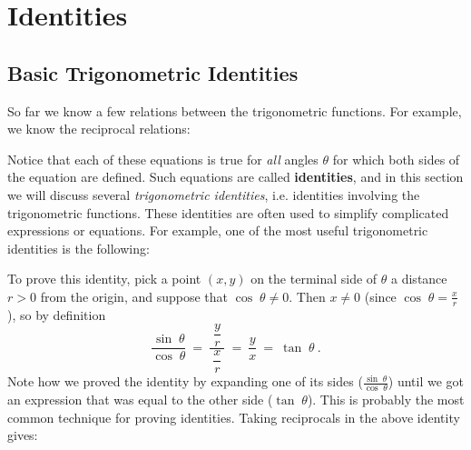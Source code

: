 \chapter{Identities}
\section{Basic Trigonometric Identities}
So far we know a few relations between the trigonometric functions. For example, we know the
reciprocal relations:

\begin{center}\end{center}

Notice that each of these equations is true for \emph{all} angles $\theta$ for which both sides
of the equation are defined. Such equations are called \textbf{identities}, and
in this section we will discuss several \emph{trigonometric identities}, i.e. identities involving
the trigonometric functions. These identities are often used to simplify complicated expressions or
equations. For example, one of the most useful trigonometric identities is the following:

\begin{center}\end{center}

To prove this identity, pick a point $(x,y)$ on the terminal side of $\theta$ a distance $r >0$ from
the origin, and suppose that $\cos\;\theta \ne 0$. Then $x \ne 0$ (since $\cos\;\theta =
\frac{x}{r}$), so by definition
\begin{displaymath}
 \frac{\sin\;\theta}{\cos\;\theta} ~=~ \dfrac{~\dfrac{y}{r}~}{~\dfrac{x}{r}~} ~=~ \frac{y}{x} ~=~
 \tan\;\theta ~.
\end{displaymath}
Note how we proved the identity by expanding one of its sides ($\frac{\sin\;\theta}{\cos\;\theta}$)
until we got an expression that was equal to the other side ($\tan\;\theta$). This is probably the
most common technique for proving identities. Taking reciprocals in the above identity gives:

